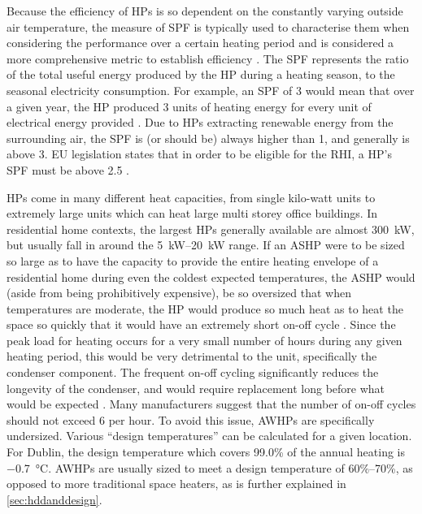 Because the efficiency of \acp{HP} is so dependent on the constantly varying outside air temperature, the measure of \ac{SPF} is typically used to characterise them when considering the performance over a certain heating period and is considered a more comprehensive metric to establish \HP efficiency \cite{seai_heat_2020,nowak_2018}. The \ac{SPF} represents the ratio of the total useful energy produced by the \ac{HP} during a heating season, to the seasonal electricity consumption. For example, an \ac{SPF} of 3 would mean that over a given year, the \ac{HP} produced 3 units of heating energy for every unit of electrical energy provided \cite{seai_heat_2020}. Due to \acp{HP} extracting renewable energy from the surrounding air, the \ac{SPF} is (or should be) always higher than 1, and generally is above 3. EU legislation states that in order to be eligible for the \ac{RHI}, a \ac{HP}'s \ac{SPF} must be above 2.5 \cite{eu-114-2014}. 

\acp{HP} come in many different heat capacities, from single kilo-watt units to extremely large units which can heat large multi storey office buildings. In residential home contexts, the largest \acp{HP} generally available are almost \SI{300}{\kilo\watt}, but usually fall in around the \qtyrange{5}{20}{\kilo\watt} range. If an \ac{ASHP} were to be sized so large as to have the capacity to provide the entire heating envelope of a residential home during even the coldest expected temperatures, the \ac{ASHP} would (aside from being prohibitively expensive), be so oversized that when temperatures are moderate, the \ac{HP} would produce so much heat as to heat the space so quickly that it would have an extremely short on-off cycle \cite{bee_air-source_2019}. Since the peak load for heating occurs for a very small number of hours during any given heating period, this would be very detrimental to the unit, specifically the condenser component. The frequent on-off cycling significantly reduces the longevity of the condenser, and would require replacement long before what would be expected \cite{STIEBEL_2012}. Many manufacturers suggest that the number of on-off cycles should not exceed 6 per hour. %
To avoid this issue, \acp{AWHP} are specifically undersized. Various ``design temperatures'' can be calculated for a given location. For Dublin, the design temperature which covers 99.0\% of the annual heating is \SI{-0.7}{\celsius}. \acp{AWHP} are usually sized to meet a design temperature of 60\%--70\%, as opposed to more traditional space heaters, as is further explained in \cref{sec:hddanddesign}.

